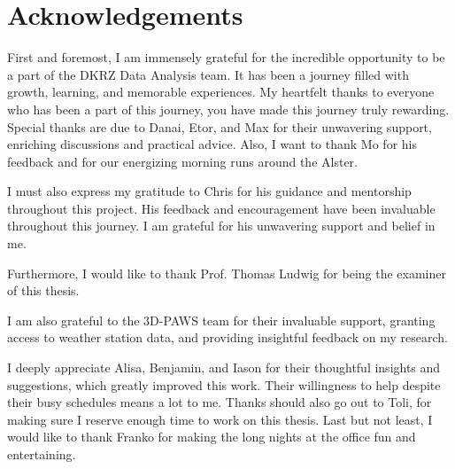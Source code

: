 \section*{Acknowledgements}

First and foremost, I am immensely grateful for the incredible opportunity to be a part of the DKRZ Data Analysis team.
It has been a journey filled with growth, learning, and memorable experiences.
My heartfelt thanks to everyone who has been a part of this journey, you have made this journey truly rewarding. Special thanks are due to Danai, Etor, and Max for their unwavering support, enriching discussions and practical advice.
Also, I want to thank Mo for his feedback and for our energizing morning runs around the Alster.

I must also express my gratitude to Chris for his guidance and mentorship throughout this project.
His feedback and encouragement have been invaluable throughout this journey.
I am grateful for his unwavering support and belief in me.

Furthermore, I would like to thank Prof. Thomas Ludwig for being the examiner of this thesis.

I am also grateful to the 3D-PAWS team for their invaluable support, granting access to weather station data, and providing insightful feedback on my research.

I deeply appreciate Alisa, Benjamin, and Iason for their thoughtful insights and suggestions, which greatly improved this work.
Their willingness to help despite their busy schedules means a lot to me.
Thanks should also go out to Toli, for making sure I reserve enough time to work on this thesis.
Last but not least, I would like to thank Franko for making the long nights at the office fun and entertaining.






